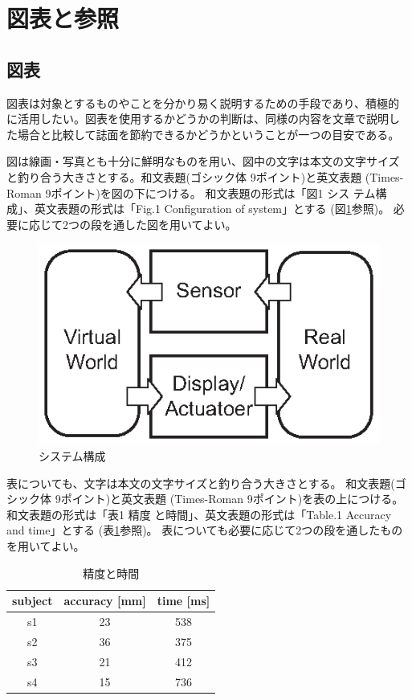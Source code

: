 \documentclass[a4paper,twoside]{jarticle}
\begin{document}
\section{図表と参照}

\subsection{図表}
図表は対象とするものやことを分かり易く説明するための手段であり、積極的
に活用したい。図表を使用するかどうかの判断は、同様の内容を文章で説明し
た場合と比較して誌面を節約できるかどうかということが一つの目安である。

図は線画・写真とも十分に鮮明なものを用い、図中の文字は本文の文字サイズ
と釣り合う大きさとする。和文表題(ゴシック体 9ポイント)と英文表題
(Times-Roman 9ポイント)を図の下につける。 和文表題の形式は「図1 シス
テム構成」、英文表題の形式は「Fig.1 Configuration of system」とする
(図\ref{fig:zu}参照)。
必要に応じて2つの段を通した図を用いてよい。

\begin{figure}[ht]
\begin{center}
\includegraphics[scale=1.0]{images/zu.eps}
\end{center}
\caption{システム構成}
\label{fig:zu}
\end{figure}

表についても、文字は本文の文字サイズと釣り合う大きさとする。
和文表題(ゴシック体 9ポイント)と英文表題
(Times-Roman 9ポイント)を表の上につける。 和文表題の形式は「表1 精度
と時間」、英文表題の形式は「Table.1 Accuracy and time」とする
(表\ref{tab:ta}参照)。
表についても必要に応じて2つの段を通したものを用いてよい。

\begin{table}[ht]
\caption{精度と時間}
\label{tab:ta}
\begin{center}
\begin{tabular}{|c|c|c|}
\hline
subject & accuracy [mm] & time [ms]\\ \hline
s1      & 23       & 538  \\ \hline
s2      & 36       & 375  \\ \hline
s3      & 21       & 412  \\ \hline
s4      & 15       & 736  \\ \hline
\end{tabular}
\end{center}
\end{table}
\end{document}
